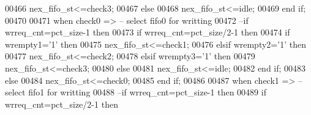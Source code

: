 \begin{DoxyCode}
00466                \textcolor{vhdlchar}{nex_fifo_st}\textcolor{vhdlchar}{<=}\textcolor{vhdlchar}{check3};                     
00467             \textcolor{keywordflow}{else} 
00468               \textcolor{vhdlchar}{nex_fifo_st}\textcolor{vhdlchar}{<=}\textcolor{vhdlchar}{idle};
00469             \textcolor{keywordflow}{end} \textcolor{keywordflow}{if};
00470             
00471       \textcolor{keywordflow}{when} \textcolor{vhdlchar}{check0} \textcolor{vhdlchar}{=}\textcolor{vhdlchar}{>}\textcolor{keyword}{ -- select fifo0 for writting}
00472 \textcolor{keyword}{                --if wrreq\_cnt=pct\_size-1  then}
00473             \textcolor{keywordflow}{if} \textcolor{vhdlchar}{wrreq_cnt}\textcolor{vhdlchar}{=}\textcolor{vhdlchar}{pct_size}\textcolor{vhdlchar}{/}\textcolor{vhdllogic}{2-1}  \textcolor{keywordflow}{then} 
00474               \textcolor{keywordflow}{if} \textcolor{vhdlchar}{wrempty1}\textcolor{vhdlchar}{=}\textcolor{vhdlchar}{'}\textcolor{vhdllogic}{}\textcolor{vhdllogic}{1}\textcolor{vhdlchar}{'} \textcolor{keywordflow}{then} 
00475                   \textcolor{vhdlchar}{nex_fifo_st}\textcolor{vhdlchar}{<=}\textcolor{vhdlchar}{check1};
00476               \textcolor{keywordflow}{elsif} \textcolor{vhdlchar}{wrempty2}\textcolor{vhdlchar}{=}\textcolor{vhdlchar}{'}\textcolor{vhdllogic}{}\textcolor{vhdllogic}{1}\textcolor{vhdlchar}{'} \textcolor{keywordflow}{then} 
00477                   \textcolor{vhdlchar}{nex_fifo_st}\textcolor{vhdlchar}{<=}\textcolor{vhdlchar}{check2};
00478                   \textcolor{keywordflow}{elsif} \textcolor{vhdlchar}{wrempty3}\textcolor{vhdlchar}{=}\textcolor{vhdlchar}{'}\textcolor{vhdllogic}{}\textcolor{vhdllogic}{1}\textcolor{vhdlchar}{'} \textcolor{keywordflow}{then} 
00479                   \textcolor{vhdlchar}{nex_fifo_st}\textcolor{vhdlchar}{<=}\textcolor{vhdlchar}{check3};
00480               \textcolor{keywordflow}{else}
00481                  \textcolor{vhdlchar}{nex_fifo_st}\textcolor{vhdlchar}{<=}\textcolor{vhdlchar}{idle};
00482               \textcolor{keywordflow}{end} \textcolor{keywordflow}{if};  
00483             \textcolor{keywordflow}{else}
00484               \textcolor{vhdlchar}{nex_fifo_st}\textcolor{vhdlchar}{<=}\textcolor{vhdlchar}{check0};
00485              \textcolor{keywordflow}{end} \textcolor{keywordflow}{if};
00486               
00487       \textcolor{keywordflow}{when} \textcolor{vhdlchar}{check1} \textcolor{vhdlchar}{=}\textcolor{vhdlchar}{>}\textcolor{keyword}{ -- select fifo1 for writting}
00488 \textcolor{keyword}{            --if wrreq\_cnt=pct\_size-1 then }
00489                 \textcolor{keywordflow}{if} \textcolor{vhdlchar}{wrreq_cnt}\textcolor{vhdlchar}{=}\textcolor{vhdlchar}{pct_size}\textcolor{vhdlchar}{/}\textcolor{vhdllogic}{2-1} \textcolor{keywordflow}{then}

\end{DoxyCode}
